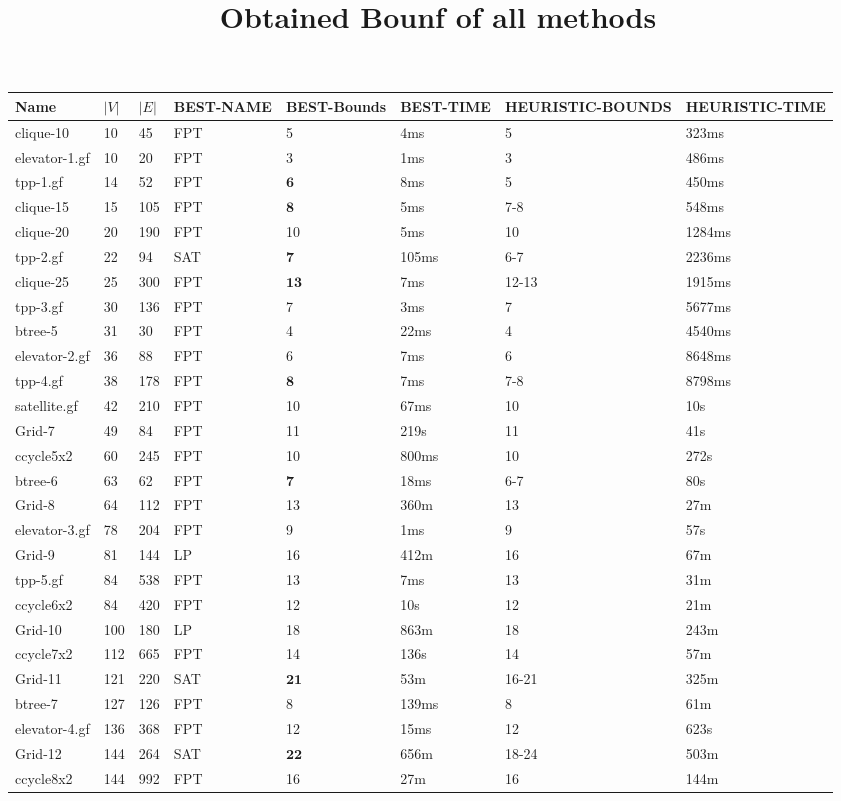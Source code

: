 \documentclass{article}
\title{Obtained Bounf of all methods}
\begin{document}
\maketitle

\begin{longtable}{|l |l |l |l |l |l |l |l |}
\hline
Name&$|V|$&$|E|$&BEST-NAME&BEST-Bounds&BEST-TIME&HEURISTIC-BOUNDS&HEURISTIC-TIME\\
\hline
clique-10&10&45&FPT&5&4ms&5&323ms\\
elevator-1.gf&10&20&FPT&3&1ms&3&486ms\\
tpp-1.gf&14&52&FPT&$\mathbf{6}$&8ms&5&450ms\\
clique-15&15&105&FPT&$\mathbf{8}$&5ms&7-8&548ms\\
clique-20&20&190&FPT&10&5ms&10&1284ms\\
tpp-2.gf&22&94&SAT&$\mathbf{7}$&105ms&6-7&2236ms\\
clique-25&25&300&FPT&$\mathbf{13}$&7ms&12-13&1915ms\\
tpp-3.gf&30&136&FPT&7&3ms&7&5677ms\\
btree-5&31&30&FPT&4&22ms&4&4540ms\\
elevator-2.gf&36&88&FPT&6&7ms&6&8648ms\\
tpp-4.gf&38&178&FPT&$\mathbf{8}$&7ms&7-8&8798ms\\
satellite.gf&42&210&FPT&10&67ms&10&10s\\
Grid-7&49&84&FPT&11&219s&11&41s\\
ccycle5x2&60&245&FPT&10&800ms&10&272s\\
btree-6&63&62&FPT&$\mathbf{7}$&18ms&6-7&80s\\
Grid-8&64&112&FPT&13&360m&13&27m\\
elevator-3.gf&78&204&FPT&9&1ms&9&57s\\
Grid-9&81&144&LP&16&412m&16&67m\\
tpp-5.gf&84&538&FPT&13&7ms&13&31m\\
ccycle6x2&84&420&FPT&12&10s&12&21m\\
Grid-10&100&180&LP&18&863m&18&243m\\
ccycle7x2&112&665&FPT&14&136s&14&57m\\
Grid-11&121&220&SAT&$\mathbf{21}$&53m&16-21&325m\\
btree-7&127&126&FPT&8&139ms&8&61m\\
elevator-4.gf&136&368&FPT&12&15ms&12&623s\\
Grid-12&144&264&SAT&$\mathbf{22}$&656m&18-24&503m\\
ccycle8x2&144&992&FPT&16&27m&16&144m\\

\end{longtable}
\end{document}
